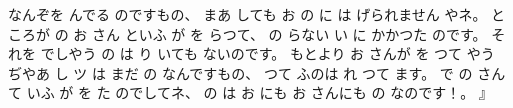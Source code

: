 なんぞを
んでる
のですもの、
%
まあ
しても
お
%
の
に
は
げられません
やネ。
%
ところが
の
お
さん
といふ
が
を
らつて、
%
の
らない
い
に
かかつた
のです。
%
それを
でしやう
の
は
り
いても
ないのです。
%
もとより
お
さんが
を
つて
やう
ぢやあ
し
ツ
は
まだ
の
なんですもの、
%
つて
ふのは
れ
つて
ます。
%
で
の
さん
て
いふ
が
を
た
のでしてネ、
%
の
は
お
にも
お
さんにも
の
なのです！。
』
